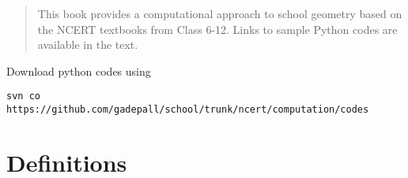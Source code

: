 \documentclass[journal,12pt,twocolumn]{IEEEtran}
\begin{document}



%

\begin{abstract}
This book provides a computational approach to school geometry based on the NCERT textbooks from Class 6-12.  Links to sample Python codes are available in the text.  
\end{abstract}
Download python codes using 
\begin{lstlisting}
svn co https://github.com/gadepall/school/trunk/ncert/computation/codes
\end{lstlisting}

\section{Definitions}
\end{document}
